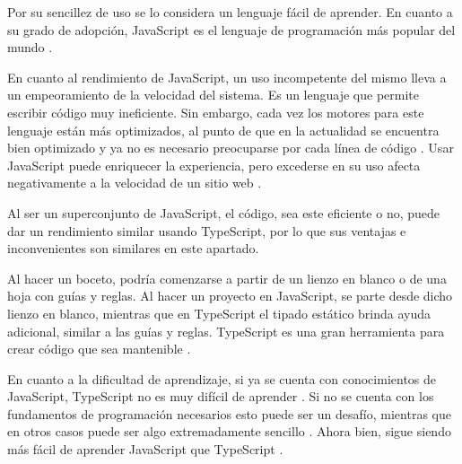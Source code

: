 \documentclass{article}
\begin{document}
Por su sencillez de uso se lo considera un lenguaje fácil de aprender. En cuanto a su grado de adopción, JavaScript es el lenguaje de programación más popular del mundo \parencite{w3schoolsJs}. 

En cuanto al rendimiento de JavaScript, un uso incompetente del mismo lleva a un empeoramiento de la velocidad del sistema. Es un lenguaje que permite escribir código muy ineficiente. Sin embargo, cada vez los motores para este lenguaje están más optimizados, al punto de que en la actualidad se encuentra bien optimizado y ya no es necesario preocuparse por cada línea de código \parencite{arturWojnar}. Usar JavaScript puede enriquecer la experiencia, pero excederse en su uso afecta negativamente a la velocidad de un sitio web \parencite{timVanSchie}.

Al ser un superconjunto de JavaScript, el código, sea este eficiente o no, puede dar un rendimiento similar usando TypeScript, por lo que sus ventajas e inconvenientes son similares en este apartado.

Al hacer un boceto, podría comenzarse a partir de un lienzo en blanco o de una hoja con guías y reglas. Al hacer un proyecto en JavaScript, se parte desde dicho lienzo en blanco, mientras que en TypeScript el tipado estático brinda ayuda adicional, similar a las guías y reglas. TypeScript es una gran herramienta para crear código que sea mantenible \parencite{hao}. 

En cuanto a la dificultad de aprendizaje, si ya se cuenta con conocimientos de JavaScript, TypeScript no es muy difícil de aprender \parencite{freecodecampTs}. Si no se cuenta con los fundamentos de programación necesarios esto puede ser un desafío, mientras que en otros casos puede ser algo extremadamente sencillo \parencite{thecodebytes}. Ahora bien, sigue siendo más fácil de aprender JavaScript que TypeScript \parencite{isJsHardToLearn}.
\end{document}
